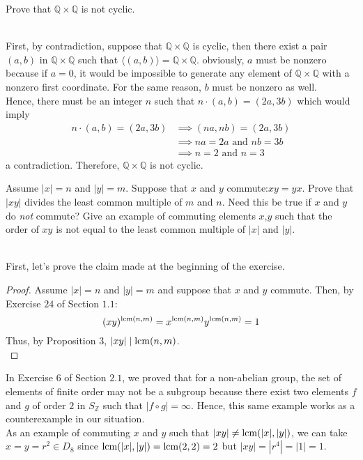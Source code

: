 \begin{exercise}
    Prove that $\mathbb{Q}\times\mathbb{Q}$ is not cyclic.\\
\end{exercise}

\begin{solution}
    \\First, by contradiction, suppose that $\mathbb{Q}\times\mathbb{Q}$ is
    cyclic, then there exist a pair $(a,b)$ in $\mathbb{Q}\times\mathbb{Q}$
    such that $\langle (a,b)\rangle = \mathbb{Q}\times\mathbb{Q}$. obviously,
    $a$ must be nonzero because if $a=0$, it would be impossible to generate
    any element of $\mathbb{Q}\times\mathbb{Q}$ with a nonzero first
    coordinate. For the same reason, $b$ must be nonzero as well.\\
    Hence, there must be an integer $n$ such that $n\cdot(a,b)=(2a,3b)$
    which would imply
    \begin{align*}
        n\cdot(a,b)=(2a,3b) &\implies (na,nb)=(2a,3b) \\
        &\implies na=2a \text{ and } nb=3b \\
        &\implies n=2 \text{ and } n=3
    \end{align*}
    a contradiction. Therefore, $\mathbb{Q}\times\mathbb{Q}$ is not cyclic.
    \\
\end{solution}

\begin{exercise}
    Assume $|x|=n$ and $|y|=m$. Suppose that $x$ and $y$ commute:$xy=yx$.
    Prove that $|xy|$ divides the least common multiple of $m$ and $n$.
    Need this be true if $x$ and $y$ do \textit{not} commute? Give an
    example of commuting elements $x$,$y$ such that the order of $xy$ is
    not equal to the least common multiple of $|x|$ and $|y|$.\\
\end{exercise}

\begin{solution}
    \\First, let's prove the claim made at the beginning of the exercise.
    \begin{proof}
        Assume $|x|=n$ and $|y|=m$ and suppose that $x$ and $y$ commute.
        Then, by Exercise $24$ of Section $1.1$:
        $$(xy)^{\operatorname{lcm}(n,m)}=x^{\operatorname{lcm}(n,m)}y^{\operatorname{lcm}(n,m)}=1$$
        Thus, by Proposition $3$, $|xy| \mathrel{|} \operatorname{lcm}(n,m)$.\\
    \end{proof}
    In Exercise $6$ of Section $2.1$, we proved that for a non-abelian
    group, the set of elements of finite order may not be a subgroup because
    there exist two elements $f$ and $g$ of order $2$ in $S_{\mathbb{Z}}$
    such that $|f\circ g|=\infty$. Hence, this same example works as a
    counterexample in our situation.\\
    As an example of commuting $x$ and $y$ such that $|xy|\neq \operatorname{lcm}(|x|,
    |y|)$, we can take $x=y=r^2\in D_8$ since $\operatorname{lcm}(|x|,|y|)=\operatorname{lcm}(2,2)=2$
    but $|xy|=|r^4|=|1|=1$.\\
\end{solution}

